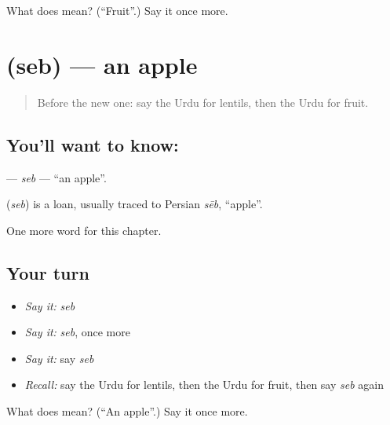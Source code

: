 \begin{tcolorbox}[breakable,colback=teal!4,colframe=teal!35!black,title={Before you move on}]
What does  mean? (\textquotedblleft{}Fruit\textquotedblright{}.) Say it once more.
\end{tcolorbox}
\section[\texorpdfstring{\ur{سیب} (seb)}{سیب (seb)}]{ (seb) — an apple}

\label{lesson:UR-C54-seb}



\begin{quote}
Before the new one: say the Urdu for lentils, then the Urdu for fruit.
\end{quote}

\subsection*{You'll want to know: }
\textbf{} — \emph{seb} — \textquotedblleft{}an apple\textquotedblright{}.

\begin{cousinweb}
\textbf{} (\emph{seb}) is a loan, usually traced to Persian \emph{sēb}, \textquotedblleft{}apple\textquotedblright{}.
\end{cousinweb}

\begin{grammarlens}[title={What you've built}]
One more word for this chapter.
\end{grammarlens}

\subsection*{Your turn}
\begin{itemize}
\raggedright
  \item \emph{Say it:} \emph{seb}
  \item \emph{Say it:} \emph{seb}, once more
  \item \emph{Say it:} say \emph{seb}
  \item \emph{Recall:} say the Urdu for lentils, then the Urdu for fruit, then say \emph{seb} again
\end{itemize}

\begin{tcolorbox}[breakable,colback=teal!4,colframe=teal!35!black,title={Before you move on}]
What does  mean? (\textquotedblleft{}An apple\textquotedblright{}.) Say it once more.
\end{tcolorbox}
